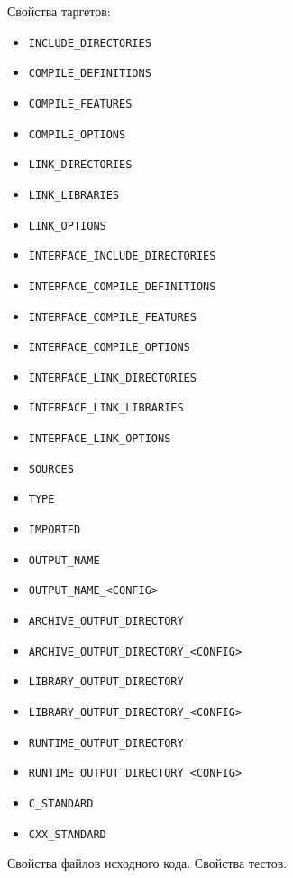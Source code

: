 \documentclass{article}
\begin{document}
\begin{enumerate}
\begin{enumerate}[a.]
\newpage
Свойства таргетов:
\begin{multicols}{2}
\begin{itemize}
\item \texttt{INCLUDE\_DIRECTORIES}
\item \texttt{COMPILE\_DEFINITIONS}
\item \texttt{COMPILE\_FEATURES}
\item \texttt{COMPILE\_OPTIONS}
\item \texttt{LINK\_DIRECTORIES}
\item \texttt{LINK\_LIBRARIES}
\item \texttt{LINK\_OPTIONS}
\item \texttt{INTERFACE\_INCLUDE\_DIRECTORIES}
\item \texttt{INTERFACE\_COMPILE\_DEFINITIONS}
\item \texttt{INTERFACE\_COMPILE\_FEATURES}
\item \texttt{INTERFACE\_COMPILE\_OPTIONS}
\item \texttt{INTERFACE\_LINK\_DIRECTORIES}
\item \texttt{INTERFACE\_LINK\_LIBRARIES}
\item \texttt{INTERFACE\_LINK\_OPTIONS}
\item \texttt{SOURCES}
\item \texttt{TYPE}
\item \texttt{IMPORTED}
\item \texttt{OUTPUT\_NAME}
\item \texttt{OUTPUT\_NAME\_<CONFIG>}
\item \texttt{ARCHIVE\_OUTPUT\_DIRECTORY}
\item \texttt{ARCHIVE\_OUTPUT\_DIRECTORY\_<CONFIG>}
\item \texttt{LIBRARY\_OUTPUT\_DIRECTORY}
\item \texttt{LIBRARY\_OUTPUT\_DIRECTORY\_<CONFIG>}
\item \texttt{RUNTIME\_OUTPUT\_DIRECTORY}
\item \texttt{RUNTIME\_OUTPUT\_DIRECTORY\_<CONFIG>}
\item \texttt{C\_STANDARD}
\item \texttt{CXX\_STANDARD}
\end{itemize}
\end{multicols}
Свойства файлов исходного кода. Свойства тестов.


\end{enumerate}
\end{enumerate}
\end{document}
